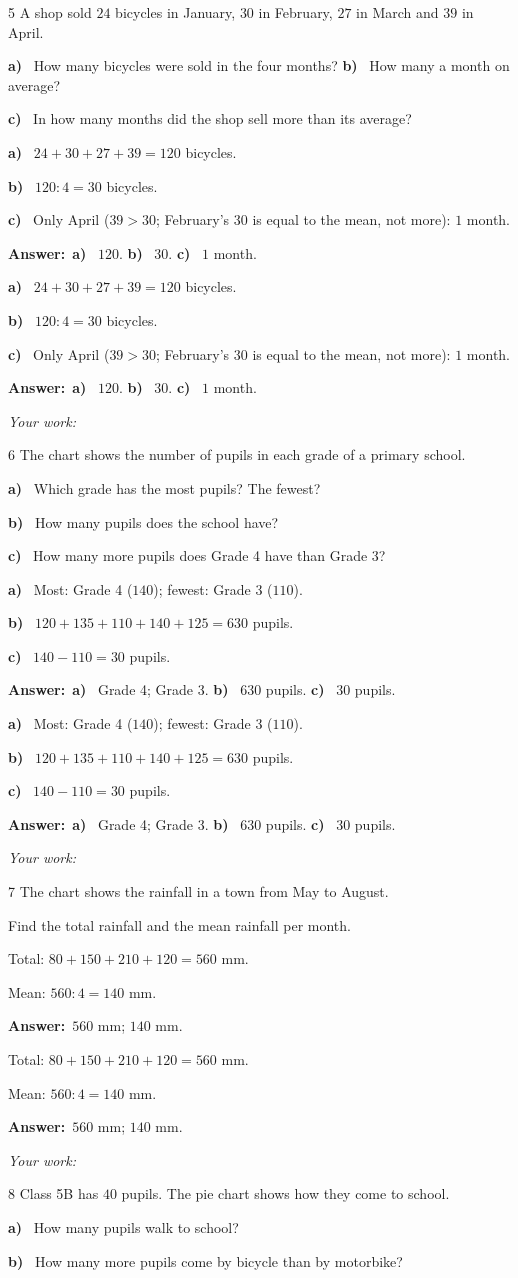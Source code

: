 \documentclass[11pt]{article}
\newif\ifsol \soltrue
\providecommand{\AnsWord}{Đáp số}
\newcommand{\dapso}[1]{\par\textbf{\AnsWord:}\ #1}
\newcommand{\probsol}[1]{%
  \begin{lrbox}{\solmeasure}\begin{minipage}{\dimexpr\linewidth-24pt\relax}#1\end{minipage}\end{lrbox}%
  \ifsol
    \begin{solbox}#1\end{solbox}%
  \else
    \setlength{\solht}{\dimexpr\ht\solmeasure+\dp\solmeasure+0.85cm\relax}%
    \ifdim\solht<1.35cm\setlength{\solht}{1.35cm}\fi
    \begin{tcolorbox}[colback=white,colframe=Line,boxrule=0.8pt,arc=5pt,
      left=8pt,right=8pt,top=4pt,bottom=4pt,height=\solht]{\footnotesize\color{Slate}\itshape\WorkWord}\end{tcolorbox}%
  \fi}
\newcommand{\pa}[1]{\textbf{#1)}\ }
\newcommand{\gap}{\vspace{0.3cm}}
\def\WorkWord{Your work:}
\def\AnsWord{Answer}
\begin{document}
\gap
\begin{probbox}{5}{\relax}
A shop sold $24$ bicycles in January, $30$ in February, $27$ in March and $39$ in April.\par
\pa{a} How many bicycles were sold in the four months? \quad \pa{b} How many a month on average?\par
\pa{c} In how many months did the shop sell more than its average?
\end{probbox}
\probsol{
\pa{a} $24+30+27+39=120$ bicycles.\par
\pa{b} $120:4=30$ bicycles.\par
\pa{c} Only April ($39>30$; February's $30$ is equal to the mean, not more): $1$ month.
\dapso{\pa{a} $120$. \pa{b} $30$. \pa{c} $1$ month.}}
\gap
\needspace{8.5cm}
\begin{probbox}{6}{\relax}
The chart shows the number of pupils in each grade of a primary school.
\begin{center}
\end{center}
\pa{a} Which grade has the most pupils? The fewest?\par
\pa{b} How many pupils does the school have?\par
\pa{c} How many more pupils does Grade 4 have than Grade 3?
\end{probbox}
\probsol{
\pa{a} Most: Grade 4 ($140$); fewest: Grade 3 ($110$).\par
\pa{b} $120+135+110+140+125=630$ pupils.\par
\pa{c} $140-110=30$ pupils.
\dapso{\pa{a} Grade 4; Grade 3. \pa{b} $630$ pupils. \pa{c} $30$ pupils.}}
\gap
\needspace{8.5cm}
\begin{probbox}{7}{\relax}
The chart shows the rainfall in a town from May to August.
\begin{center}
\end{center}
Find the total rainfall and the mean rainfall per month.
\end{probbox}
\probsol{
Total: $80+150+210+120=560$ mm.\par Mean: $560:4=140$ mm.
\dapso{$560$ mm; $140$ mm.}}
\gap
\needspace{7.5cm}
\begin{probbox}{8}{\relax}
Class 5B has $40$ pupils. The pie chart shows how they come to school.
\begin{center}
\end{center}
\pa{a} How many pupils walk to school?\par
\pa{b} How many more pupils come by bicycle than by motorbike?
\end{probbox}
\end{document}
